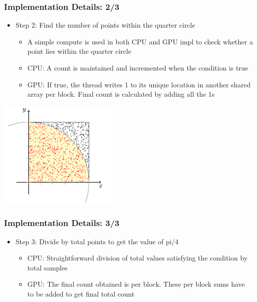 \documentclass[mathserif]{beamer}
\begin{document}
\begin{frame}                                                                                                                                                                          
\frametitle{Implementation Details: 2/3}
\begin{itemize}
\item Step 2: Find the number of points within the quarter circle
\begin{itemize}
\item A simple compute is used in both CPU and GPU impl to check whether a point lies within the quarter circle 
\item CPU: A count is maintained and incremented when the condition is true
\item GPU: If true, the thread writes 1 to its unique location in another shared array per block. Final count is calculated by adding all the 1s 
\end{itemize}
\end{itemize}
\begin{center}
\includegraphics[scale=0.5]{mc.png}
\end{center}
\end{frame}              

\begin{frame}                                                                                                                                                                          
\frametitle{Implementation Details: 3/3}
\begin{itemize}
\item Step 3: Divide by total points to get the value of pi/4
\begin{itemize}
\item CPU: Straightforward division of total values satisfying the condition by total samples 
\item GPU: The final count obtained is per block. These per block sums have to be added to get final total count 
\end{itemize}
\end{itemize}
\end{frame}              
 
\end{document}
